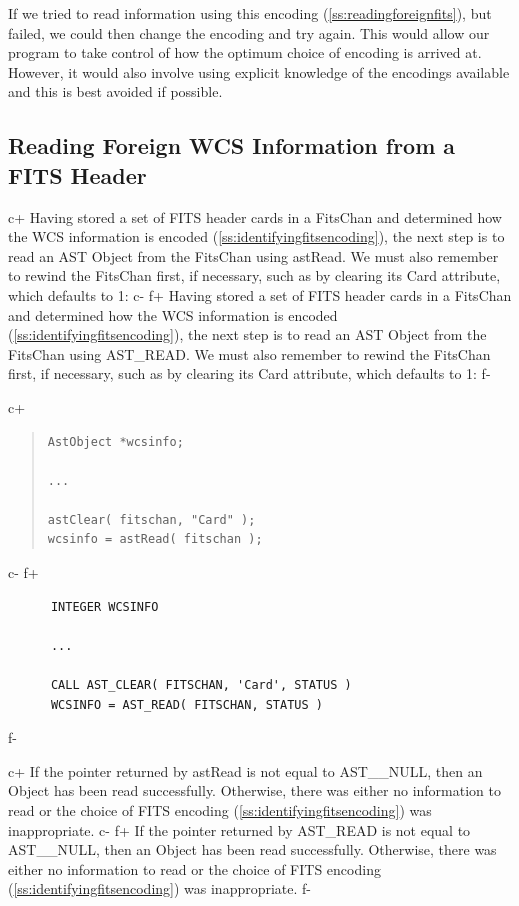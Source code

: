\documentclass[twoside,11pt]{article}
\newcommand{\secref}[1]{\S\ref{#1}}
\renewcommand{\secref}[1]{\ref{#1}}
\begin{document}
If we tried to read information using this encoding
(\secref{ss:readingforeignfits}), but failed, we could then change the
encoding and try again.  This would allow our program to take control
of how the optimum choice of encoding is arrived at. However, it would
also involve using explicit knowledge of the encodings available and
this is best avoided if possible.

\subsection{\label{ss:readingforeignfits}Reading Foreign WCS Information from a FITS Header}

c+
Having stored a set of FITS header cards in a FitsChan and determined
how the WCS information is encoded
(\secref{ss:identifyingfitsencoding}), the next step is to read an AST
Object from the FitsChan using astRead. We must also remember to
rewind the FitsChan first, if necessary, such as by clearing its Card
attribute, which defaults to 1:
c-
f+
Having stored a set of FITS header cards in a FitsChan and determined
how the WCS information is encoded
(\secref{ss:identifyingfitsencoding}), the next step is to read an AST
Object from the FitsChan using AST\_READ. We must also remember to
rewind the FitsChan first, if necessary, such as by clearing its Card
attribute, which defaults to 1:
f-

c+
\begin{quote}
\small
\begin{verbatim}
AstObject *wcsinfo;

...

astClear( fitschan, "Card" );
wcsinfo = astRead( fitschan );
\end{verbatim}
\normalsize
\end{quote}
c-
f+
\small
\begin{verbatim}
      INTEGER WCSINFO

      ...

      CALL AST_CLEAR( FITSCHAN, 'Card', STATUS )
      WCSINFO = AST_READ( FITSCHAN, STATUS )
\end{verbatim}
\normalsize
f-

c+
If the pointer returned by astRead is not equal to AST\_\_NULL, then
an Object has been read successfully. Otherwise, there was either no
information to read or the choice of FITS encoding
(\secref{ss:identifyingfitsencoding}) was inappropriate.
c-
f+
If the pointer returned by AST\_READ is not equal to AST\_\_NULL, then
an Object has been read successfully. Otherwise, there was either no
information to read or the choice of FITS encoding
(\secref{ss:identifyingfitsencoding}) was inappropriate.
f-
\end{document}
